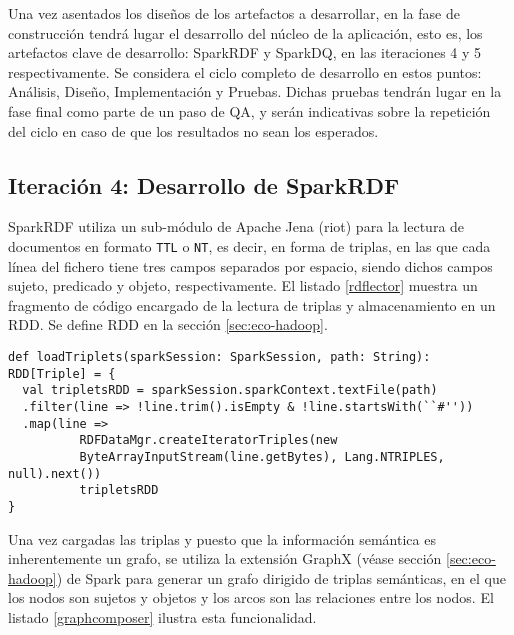 Una vez asentados los diseños de los artefactos a desarrollar, en la fase de
construcción tendrá lugar el desarrollo del núcleo de la aplicación, esto es,
los artefactos clave de desarrollo: SparkRDF y SparkDQ, en las iteraciones 4 y 5
respectivamente. Se considera el ciclo completo de desarrollo en estos puntos:
Análisis, Diseño, Implementación y Pruebas. Dichas pruebas tendrán lugar en la
fase final como parte de un paso de \acs{QA}, y serán indicativas sobre la
repetición del ciclo en caso de que los resultados no sean los esperados. 

\subsection{Iteración 4: Desarrollo de SparkRDF}
\label{iteracion4}



SparkRDF utiliza un sub-módulo de Apache Jena (riot) para la lectura de
documentos en formato \texttt{TTL} o \texttt{NT}, es decir, en forma de triplas, en las que cada línea
del fichero tiene tres campos separados por espacio, siendo dichos campos sujeto,
predicado y objeto, respectivamente. El listado \ref{rdflector} muestra un
fragmento de código encargado de la lectura de triplas y almacenamiento en un
\acs{RDD}. Se define \acs{RDD} en la sección \ref{sec:eco-hadoop}.


\lstset{escapechar=@,language=scala}
\begin{lstlisting}[caption={Fragmento del lector de triplas},captionpos=b, label=rdflector]
def loadTriplets(sparkSession: SparkSession, path: String): RDD[Triple] = {
  val tripletsRDD = sparkSession.sparkContext.textFile(path)
  .filter(line => !line.trim().isEmpty & !line.startsWith(``#''))
  .map(line =>
          RDFDataMgr.createIteratorTriples(new
          ByteArrayInputStream(line.getBytes), Lang.NTRIPLES, null).next())
          tripletsRDD
}  
\end{lstlisting}

Una vez cargadas las triplas y puesto que la información semántica es
inherentemente un grafo, se utiliza la extensión GraphX (véase sección \ref{sec:eco-hadoop}) de Spark para generar un
grafo dirigido de triplas semánticas, en el que los nodos son sujetos y objetos y los
arcos son las relaciones entre los nodos. El listado \ref{graphcomposer} ilustra
esta funcionalidad. 

